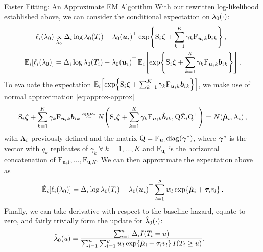 \begin{chapter}{\label{cha:approx}Faster Fitting: An Approximate EM Algorithm}
  With our rewritten log-likelihood established above, we can consider the conditional expectation on $\lambda_0(\cdot)$:
  \begin{align*}
      \elli{\lo}&\unsetp{\lo}\Delta_i\log\lo(T_i)-\lo\lb\bm{u}_i\rb^\top\exp\lbr\mathrm{S}_i\bm{\zeta} + \Sk\gamma_k\mathrm{F}_{\bm{u}_ik}\b{_k}\rbr,\\
      \Expi{\elli{\lo}}&=\Delta_i\log\lo(T_i)-\lo\lb\bm{u}_i\rb^\top\Expi{\exp\lbr\mathrm{S}_i\bm{\zeta} + \Sk\gamma_k\mathrm{F}_{\bm{u}_ik}\b{_k}\rbr}.
  \end{align*}
  To evaluate the expectation $\mathbb{E}_i\!\left[\exp\!\left\{\mathrm{S}_i\bm{\zeta} + \sum_{k=1}^K\gamma_k\mathrm{F}_{\bm{u}_ik}\bm{b}_i{_k}\right\}\right]$, we make use of normal approximation \eqref{eq:approx-approx}
  \begin{align}
      \mathrm{S}_i\bm{\zeta} + \sum_{k=1}^K\gamma_k\mathrm{F}_{\bm{u}_ik}\bm{b}_i{_k}\overset{\text{appx.}}{\sim} N\!\left(\mathrm{S}_i\bm{\zeta} + \sum_{k=1}^K\gamma_k\mathrm{F}_{\bm{u}_ik}\hat{\bm{b}}_i{_k},\mathrm{Q}\hat{\Sigma}_i\mathrm{Q}^\top\right)=N\!\left(\hat{\bm{\mu}}_i,\mathrm{A}_i\right),
  \label{eq:approx-SurvApprox}
  \end{align}
  with $\mathrm{A}_i$ previously defined and the matrix $\mathrm{Q}=\mathrm{F}_{\bm{u}_i}\mathrm{diag}\!\left(\bm{\gamma}^*\right)$, where $\bm{\gamma}^*$ is the vector with $q_k$ replicates of $\gamma_k\ \forall\ k=1,\dots,K$ and $\mathrm{F}_{\bm{u}_i}$ is the horizontal concatenation of $\mathrm{F}_{\bm{u}_i1},\dots,\mathrm{F}_{\bm{u}_iK}$. We can then approximate the expectation above as
  \begin{align*}
      \tilde{\mathbb{E}}_i\!\left[\ell_i\!\left(\lambda_0\right)\right]=\Delta_i\log\lambda_0(T_i)-\lambda_0\!\left(\bm{u}_i\right)^\top\sum_{l=1}^\varrho w_l\exp\!\left\{\hat{\bm{\mu}}_i+\bm{\tau}_i v_l\right\}.
  \end{align*}
  Finally, we can take derivative with respect to the baseline hazard, equate to zero, and fairly trivially form the update for $\hat{\lambda}_0\!\left(\cdot\right)$:
  \begin{align}
      \hat{\lambda}_0\!\left( u\right)&=\frac{\sum_{i=1}^n\Delta_i I\!\left( T_i=u\right)}{\sum_{i=1}^n\sum_{l=1}^\varrho w_l\exp\!\left\{\hat{\bm{\mu}}_i+\bm{\tau}_i v_l\right\} I(T_i\ge u)}.
  \label{eq:approx-Mstep-basehaz}
  \end{align}

\end{chapter}
